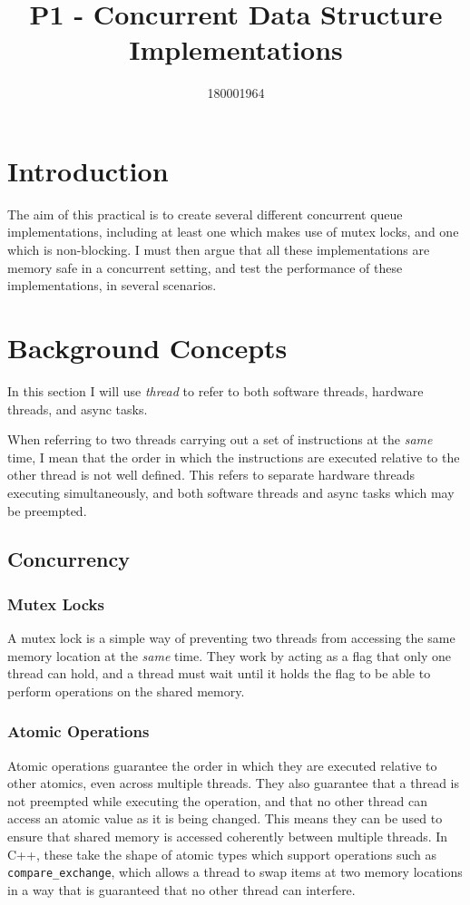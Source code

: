 \documentclass{article}
\title{P1 - Concurrent Data Structure Implementations}
\author{180001964}
\begin{document}
\maketitle

\section{Introduction}
The aim of this practical is to create several different concurrent queue
implementations, including at least one which makes use of mutex locks, and one
which is non-blocking. I must then argue that all these implementations are
memory safe in a concurrent setting, and test the performance of these
implementations, in several scenarios.

\section{Background Concepts}
In this section I will use \textit{thread} to refer to both software threads,
hardware threads, and async tasks.

When referring to two threads carrying out a set of instructions at the
\textit{same} time, I mean that the order in which the instructions are executed
relative to the other thread is not well defined. This refers to separate
hardware threads executing simultaneously, and both software threads and async tasks
which may be preempted.

\subsection{Concurrency}
\subsubsection{Mutex Locks}
A mutex lock is a simple way of preventing two threads from accessing the same
memory location at the \textit{same} time. They work by acting as a flag that
only one thread can hold, and a thread must wait until it holds the flag to
be able to perform operations on the shared memory.

\subsubsection{Atomic Operations}
Atomic operations guarantee the order in which they are executed relative to
other atomics, even across multiple threads. They also guarantee that a thread
is not preempted while executing the operation, and that no other thread can
access an atomic value as it is being changed. This means they can be used to
ensure that shared memory is accessed coherently between multiple threads. In
C++, these take the shape of atomic types which support operations such as
\verb|compare_exchange|, which allows a thread to swap items at two memory
locations in a way that is guaranteed that no other thread can interfere.
\end{document}
